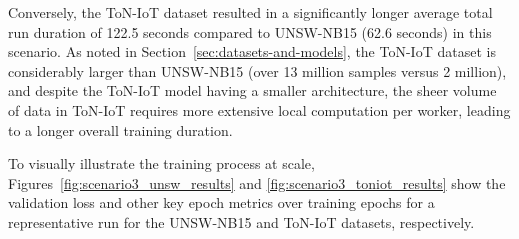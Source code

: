 Conversely, the ToN-IoT dataset resulted in a significantly longer average total run duration of 122.5 seconds compared to UNSW-NB15 (62.6 seconds) in this scenario. As noted in Section~\ref{sec:datasets-and-models}, the ToN-IoT dataset is considerably larger than UNSW-NB15 (over 13 million samples versus 2 million), and despite the ToN-IoT model having a smaller architecture, the sheer volume of data in ToN-IoT requires more extensive local computation per worker, leading to a longer overall training duration.

To visually illustrate the training process at scale, Figures~\ref{fig:scenario3_unsw_results} and \ref{fig:scenario3_toniot_results} show the validation loss and other key epoch metrics over training epochs for a representative run for the UNSW-NB15 and ToN-IoT datasets, respectively.

